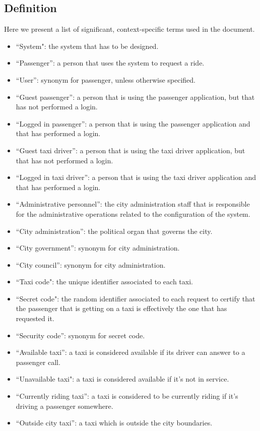 \subsection{Definition}
Here we present a list of significant, context-specific terms used in the document.
\begin{itemize}
\item “System": the system that has to be designed. 
\item “Passenger”: a person that uses the system to request a ride.
\item “User”: synonym for passenger, unless otherwise specified.
\item “Guest passenger”: a person that is using the passenger application, but that has not performed a login. 
\item “Logged in passenger”: a person that is using the passenger application and that has performed a login. 
\item “Guest taxi driver”: a person that is using the taxi driver application, but that has not performed a login. 
\item “Logged in taxi driver”: a person that is using the taxi driver application and that has performed a login. 
\item “Administrative personnel”: the city administration staff that is responsible for the administrative operations related to the configuration of the system.
\item “City administration”: the political organ that governs the city.
\item “City government”: synonym for city administration.
\item “City council”:  synonym for city administration.
\item “Taxi code": the unique identifier associated to each taxi.
\item “Secret code": the random identifier associated to each request to certify that the passenger that is getting on a taxi is effectively the one that has requested it.
\item “Security code”: synonym for secret code.
\item “Available taxi”: a taxi is considered available if its driver can answer to a passenger call.
\item “Unavailable taxi":  a taxi is considered available if it’s not in service.
\item “Currently riding taxi”: a taxi is considered to be currently riding if it’s driving a passenger somewhere. 
\item “Outside city taxi”: a taxi which is outside the city boundaries. 

\end{itemize}
